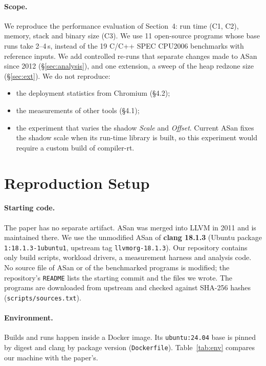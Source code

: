 \documentclass[10pt,a4paper]{article}
\newcommand{\asan}{ASan}
\newcommand{\cmd}[1]{\texttt{#1}}
\begin{document}
\paragraph{Scope.}
We reproduce the performance evaluation of Section~4: run time (C1, C2),
memory, stack and binary size (C3). We use 11 open-source programs whose base
runs take 2--4\,s, instead of the 19 C/C++ SPEC CPU2006 benchmarks with
reference inputs. We add controlled re-runs that separate changes made to
\asan{} since 2012 (\S\ref{sec:analysis}), and one extension, a sweep of the
heap redzone size (\S\ref{sec:ext}). We do not reproduce:
\begin{itemize}
\item the deployment statistics from Chromium (\S4.2);
\item the measurements of other tools (\S4.1);
\item the experiment that varies the shadow \emph{Scale} and \emph{Offset}.
Current \asan{} fixes the shadow scale when its run-time library is built, so
this experiment would require a custom build of compiler-rt.
\end{itemize}

\section{Reproduction Setup}\label{sec:setup}

\paragraph{Starting code.}
The paper has no separate artifact. \asan{} was merged into LLVM in 2011 and is
maintained there. We use the unmodified \asan{} of \textbf{clang 18.1.3}
(Ubuntu package \cmd{1:18.1.3-1ubuntu1}, upstream tag \cmd{llvmorg-18.1.3}).
Our repository contains only build scripts, workload drivers, a measurement
harness and analysis code. No source file of \asan{} or of the benchmarked
programs is modified; the repository's \cmd{README} lists the starting commit
and the files we wrote. The programs are downloaded from upstream and checked
against SHA-256 hashes (\cmd{scripts/sources.txt}).

\paragraph{Environment.}
Builds and runs happen inside a Docker image. Its \cmd{ubuntu:24.04} base is
pinned by digest and clang by package version (\cmd{Dockerfile}).
Table~\ref{tab:env} compares our machine with the paper's.
\end{document}
